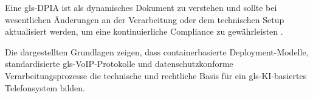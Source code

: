 Eine \gls{gls-DPIA} ist als dynamisches Dokument zu verstehen und sollte bei wesentlichen Änderungen an der Verarbeitung oder dem technischen Setup aktualisiert werden, um eine kontinuierliche Compliance zu gewährleisten \parencite{ssrn5348245}.

Die dargestellten Grundlagen zeigen, dass containerbasierte Deployment-Modelle, standardisierte \gls{gls-VoIP}-Protokolle und datenschutzkonforme Verarbeitungsprozesse die technische und rechtliche Basis für ein \gls{gls-KI}-basiertes Telefonsystem bilden.

